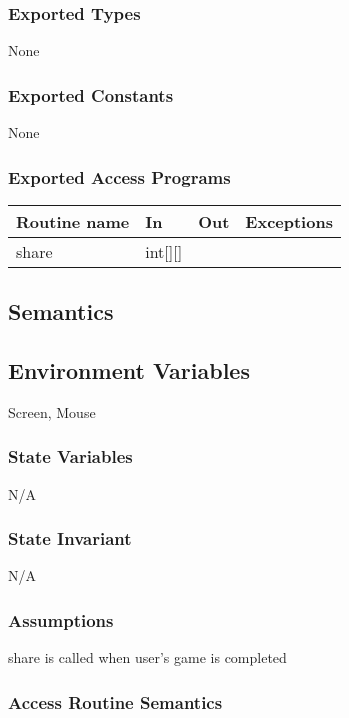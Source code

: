 \documentclass[12pt]{article}
\begin{document}
\subsubsection* {Exported Types}

None

\subsubsection* {Exported Constants}

None

\subsubsection* {Exported Access Programs}

\begin{tabular}{| l | l | l | p{6cm} |}
\hline
\textbf{Routine name} & \textbf{In} & \textbf{Out} & \textbf{Exceptions}\\
\hline
share & int[][] & ~ &  \\
\hline
\end{tabular}

\subsection* {Semantics}

\subsection*{Environment Variables}

Screen, Mouse

\subsubsection* {State Variables}
N/A

\subsubsection* {State Invariant}

N/A

\subsubsection* {Assumptions}

share is called when user's game is completed

\subsubsection* {Access Routine Semantics}
\end{document}
